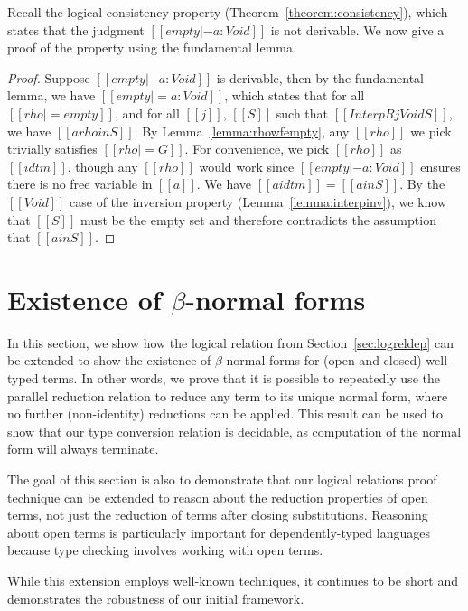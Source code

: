 \documentclass[acmsmall,screen=true,
\ifpublic review=false\else,review=true\fi
  ,anonymous=\ifanonymous true\else false\fi]{acmart}
\newcommand{\scw}[1]{}
\begin{document}
Recall the logical consistency property
(Theorem~\ref{theorem:consistency}), which states that the judgment
$[[empty |- a : Void ]]$ is not derivable. We now give a proof of the
property using the fundamental lemma.

\begin{proof}
  Suppose $[[empty |- a : Void]]$ is derivable, then by the
  fundamental lemma, we have $[[empty |= a : Void]]$, which states
  that for all $[[rho |= empty]]$, and for all $[[j]]$, $[[S]]$ such
  that $[[InterpR j Void S]]$, we have $[[a {rho} in S]]$. By
  Lemma~\ref{lemma:rhowfempty}, any $[[rho]]$ we pick trivially
  satisfies $[[rho |= G]]$. For convenience, we pick $[[rho]]$ as
  $[[idtm]]$, though any $[[rho]]$ would work since
  $[[empty |- a : Void]]$ ensures there is no free variable in
  $[[a]]$. We have $[[a {idtm}]] = [[a in S]]$. By the $[[Void]]$
  case of the inversion property (Lemma~\ref{lemma:interpinv}), we
  know that $[[S]]$ must be the empty set and therefore contradicts
  the assumption that $[[a in S]]$.
\end{proof}


\section{Existence of $\beta$-normal forms}
\label{sec:extension}
In this section, we show how the logical relation from
Section~\ref{sec:logreldep} can be extended to show the existence of $\beta$
normal forms for (open and closed) well-typed terms.  In other words, we prove
that it is possible to repeatedly use the parallel reduction relation to
reduce any term to its unique normal form, where no further (non-identity)
reductions can be applied. This result can be used to show that our type
conversion relation is decidable, as computation of the normal form will
always terminate.

The goal of this section is also to demonstrate that our logical relations
proof technique can be extended to reason about the reduction properties of
open terms, not just the reduction of terms after closing substitutions.
Reasoning about open terms is particularly important for dependently-typed
languages because type checking involves working with open terms.
\scw{
  Add when we can find a reference:
  However, even non dependently-typed languages employ such techniques,
  especially in the case of relational semantics.
}
While this extension employs well-known techniques, it continues to be short and
demonstrates the robustness of our initial framework.
\end{document}
